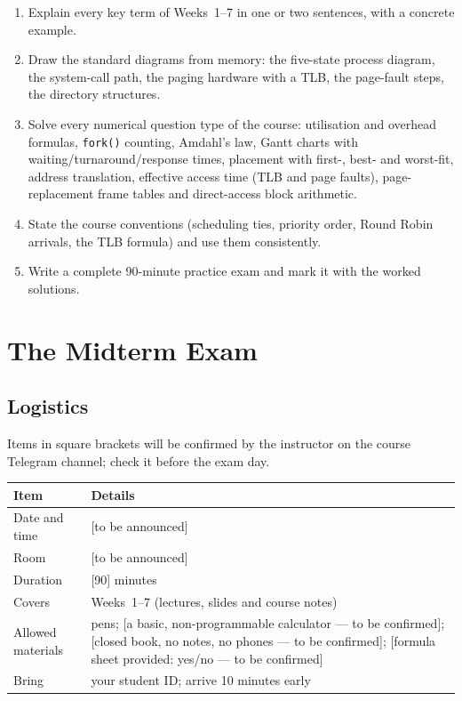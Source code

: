\documentclass[11pt,a4paper]{article}
\newcommand{\cmd}[1]{\texttt{#1}}
\begin{document}
\vspace{0.8em}
\begin{keyidea}
\begin{enumerate}[leftmargin=1.4em]
  \item Explain every key term of Weeks~1--7 in one or two sentences, with a concrete example.
  \item Draw the standard diagrams from memory: the five-state process diagram, the system-call path, the paging hardware with a TLB, the page-fault steps, the directory structures.
  \item Solve every numerical question type of the course: utilisation and overhead formulas, \cmd{fork()} counting, Amdahl's law, Gantt charts with waiting/turnaround/response times, placement with first-, best- and worst-fit, address translation, effective access time (TLB and page faults), page-replacement frame tables and direct-access block arithmetic.
  \item State the course conventions (scheduling ties, priority order, Round Robin arrivals, the TLB formula) and use them consistently.
  \item Write a complete 90-minute practice exam and mark it with the worked solutions.
\end{enumerate}
\end{keyidea}

\setcounter{tocdepth}{1}
\tableofcontents

\section{The Midterm Exam}
\label{sec:exam}
\subsection{Logistics}
Items in square brackets will be confirmed by the instructor on the course Telegram channel; check it before the exam day.
\begin{center}
\renewcommand{\arraystretch}{1.3}
\begin{tabularx}{\linewidth}{>{\raggedright\arraybackslash}p{4.0cm} X}
\toprule
\textbf{Item} & \textbf{Details} \\
\midrule
Date and time & [to be announced] \\
Room & [to be announced] \\
Duration & [90] minutes \\
Covers & Weeks~1--7 (lectures, slides and course notes) \\
Allowed materials & pens; [a basic, non-programmable calculator --- to be confirmed]; [closed book, no notes, no phones --- to be confirmed]; [formula sheet provided: yes/no --- to be confirmed] \\
Bring & your student ID; arrive 10 minutes early \\
\bottomrule
\end{tabularx}
\end{center}
\end{document}
